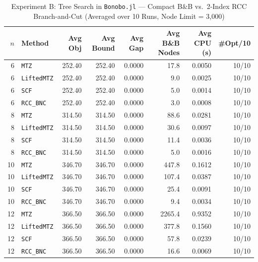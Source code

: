 \documentclass[11pt,a4paper]{article}
\begin{document}
\begin{table}[htbp]
\centering
\caption{Experiment B: Tree Search in \texttt{Bonobo.jl} --- Compact B\&B vs.\ 2-Index RCC Branch-and-Cut (Averaged over 10 Runs, Node Limit = 3,000)}
\label{tab:bonobo_bnb}
\footnotesize
\begin{tabular}{rlrrrrrr}
\toprule
$n$ & Method & Avg Obj & Avg Bound & Avg Gap & Avg B\&B Nodes & Avg CPU (s) & \#Opt/10 \\
\midrule
6 & \texttt{MTZ} & 252.40 & 252.40 & 0.0000 & 17.8 & 0.0050 & 10/10 \\
6 & \texttt{LiftedMTZ} & 252.40 & 252.40 & 0.0000 & 9.0 & 0.0025 & 10/10 \\
6 & \texttt{SCF} & 252.40 & 252.40 & 0.0000 & 5.0 & 0.0014 & 10/10 \\
6 & \texttt{RCC\_BNC} & 252.40 & 252.40 & 0.0000 & 3.0 & 0.0008 & 10/10 \\
\midrule
8 & \texttt{MTZ} & 314.50 & 314.50 & 0.0000 & 88.6 & 0.0281 & 10/10 \\
8 & \texttt{LiftedMTZ} & 314.50 & 314.50 & 0.0000 & 30.6 & 0.0097 & 10/10 \\
8 & \texttt{SCF} & 314.50 & 314.50 & 0.0000 & 11.4 & 0.0036 & 10/10 \\
8 & \texttt{RCC\_BNC} & 314.50 & 314.50 & 0.0000 & 5.0 & 0.0016 & 10/10 \\
\midrule
10 & \texttt{MTZ} & 346.70 & 346.70 & 0.0000 & 447.8 & 0.1612 & 10/10 \\
10 & \texttt{LiftedMTZ} & 346.70 & 346.70 & 0.0000 & 107.4 & 0.0387 & 10/10 \\
10 & \texttt{SCF} & 346.70 & 346.70 & 0.0000 & 25.4 & 0.0091 & 10/10 \\
10 & \texttt{RCC\_BNC} & 346.70 & 346.70 & 0.0000 & 9.4 & 0.0034 & 10/10 \\
\midrule
12 & \texttt{MTZ} & 366.50 & 366.50 & 0.0000 & 2265.4 & 0.9352 & 10/10 \\
12 & \texttt{LiftedMTZ} & 366.50 & 366.50 & 0.0000 & 377.8 & 0.1560 & 10/10 \\
12 & \texttt{SCF} & 366.50 & 366.50 & 0.0000 & 57.8 & 0.0239 & 10/10 \\
12 & \texttt{RCC\_BNC} & 366.50 & 366.50 & 0.0000 & 16.6 & 0.0069 & 10/10 \\
\bottomrule
\end{tabular}
\end{table}
\end{document}

